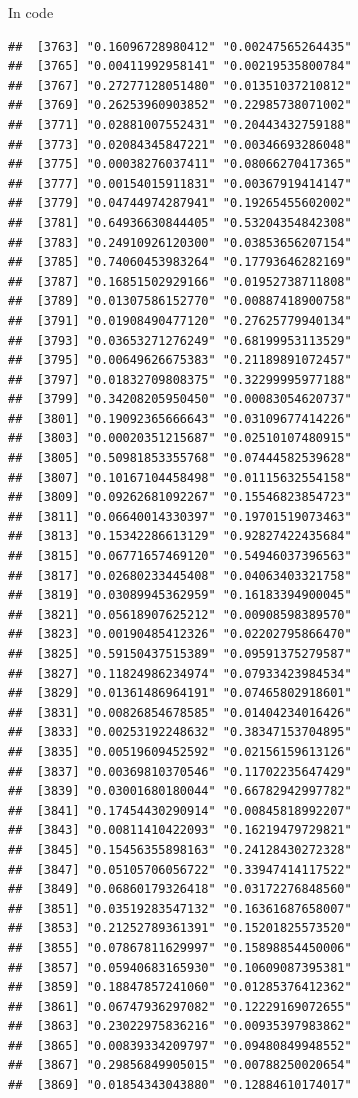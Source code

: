 \documentclass[ignorenonframetext,]{beamer}
\begin{document}
\begin{frame}[fragile]{In code}
\begin{verbatim}
##  [3763] "0.16096728980412" "0.00247565264435"
##  [3765] "0.00411992958141" "0.00219535800784"
##  [3767] "0.27277128051480" "0.01351037210812"
##  [3769] "0.26253960903852" "0.22985738071002"
##  [3771] "0.02881007552431" "0.20443432759188"
##  [3773] "0.02084345847221" "0.00346693286048"
##  [3775] "0.00038276037411" "0.08066270417365"
##  [3777] "0.00154015911831" "0.00367919414147"
##  [3779] "0.04744974287941" "0.19265455602002"
##  [3781] "0.64936630844405" "0.53204354842308"
##  [3783] "0.24910926120300" "0.03853656207154"
##  [3785] "0.74060453983264" "0.17793646282169"
##  [3787] "0.16851502929166" "0.01952738711808"
##  [3789] "0.01307586152770" "0.00887418900758"
##  [3791] "0.01908490477120" "0.27625779940134"
##  [3793] "0.03653271276249" "0.68199953113529"
##  [3795] "0.00649626675383" "0.21189891072457"
##  [3797] "0.01832709808375" "0.32299995977188"
##  [3799] "0.34208205950450" "0.00083054620737"
##  [3801] "0.19092365666643" "0.03109677414226"
##  [3803] "0.00020351215687" "0.02510107480915"
##  [3805] "0.50981853355768" "0.07444582539628"
##  [3807] "0.10167104458498" "0.01115632554158"
##  [3809] "0.09262681092267" "0.15546823854723"
##  [3811] "0.06640014330397" "0.19701519073463"
##  [3813] "0.15342286613129" "0.92827422435684"
##  [3815] "0.06771657469120" "0.54946037396563"
##  [3817] "0.02680233445408" "0.04063403321758"
##  [3819] "0.03089945362959" "0.16183394900045"
##  [3821] "0.05618907625212" "0.00908598389570"
##  [3823] "0.00190485412326" "0.02202795866470"
##  [3825] "0.59150437515389" "0.09591375279587"
##  [3827] "0.11824986234974" "0.07933423984534"
##  [3829] "0.01361486964191" "0.07465802918601"
##  [3831] "0.00826854678585" "0.01404234016426"
##  [3833] "0.00253192248632" "0.38347153704895"
##  [3835] "0.00519609452592" "0.02156159613126"
##  [3837] "0.00369810370546" "0.11702235647429"
##  [3839] "0.03001680180044" "0.66782942997782"
##  [3841] "0.17454430290914" "0.00845818992207"
##  [3843] "0.00811410422093" "0.16219479729821"
##  [3845] "0.15456355898163" "0.24128430272328"
##  [3847] "0.05105706056722" "0.33947414117522"
##  [3849] "0.06860179326418" "0.03172276848560"
##  [3851] "0.03519283547132" "0.16361687658007"
##  [3853] "0.21252789361391" "0.15201825573520"
##  [3855] "0.07867811629997" "0.15898854450006"
##  [3857] "0.05940683165930" "0.10609087395381"
##  [3859] "0.18847857241060" "0.01285376412362"
##  [3861] "0.06747936297082" "0.12229169072655"
##  [3863] "0.23022975836216" "0.00935397983862"
##  [3865] "0.00839334209797" "0.09480849948552"
##  [3867] "0.29856849905015" "0.00788250020654"
##  [3869] "0.01854343043880" "0.12884610174017"

\end{verbatim}
\end{frame}
\end{document}
